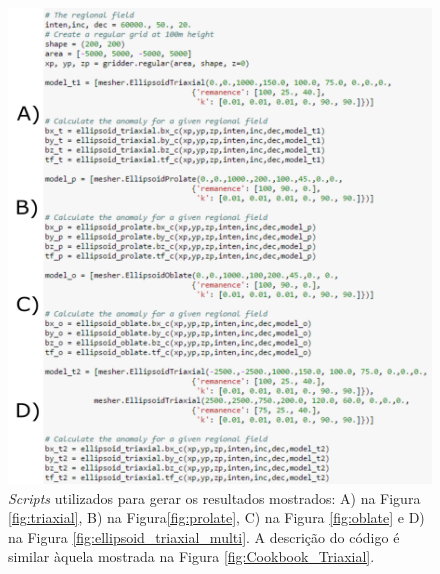 \begin{figure}[hbt!]
	\centering \includegraphics[width=16 cm,height=20 cm]{figures/mag_fields_01}
	\caption[\textit{Scripts} utilizados para gerar os resultados mostrados: A) na Figura \ref{fig:triaxial}, B) na Figura\ref{fig:prolate}, C) na Figura \ref{fig:oblate} e D) na Figura \ref{fig:ellipsoid_triaxial_multi}. A descrição do código é similar àquela mostrada na Figura \ref{fig:Cookbook_Triaxial}.]{\textit{Scripts} utilizados para gerar os resultados mostrados: A) na Figura \ref{fig:triaxial}, B) na Figura\ref{fig:prolate}, C) na Figura \ref{fig:oblate} e D) na Figura \ref{fig:ellipsoid_triaxial_multi}. A descrição do código é similar àquela mostrada na Figura \ref{fig:Cookbook_Triaxial}.}
	\label{fig:mag_fields_0}
\end{figure}

